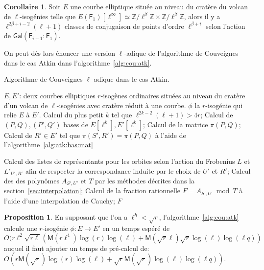 \documentclass[10pt,a4paper]{book}
\theoremstyle{plain}
\theoremstyle{definition}
\theoremstyle{definition}
\newtheorem{cor}[thm]{Corollaire}
\theoremstyle{definition}
\newtheorem{prop}[thm]{Proposition}
\theoremstyle{definition}
\theoremstyle{remark}
\theoremstyle{remark}
\theoremstyle{definition}
\begin{document}
\begin{cor} \label{cor:atk:orb:rep}
Soit $E$ une courbe elliptique située au niveau du cratère du volcan de 
$\ell$-isogénies telle que $E(\mathsf{F}_1)[\ell^{\infty}] \simeq 
\mathbb{Z}/ \ell^{\beta} \mathbb{Z} \times \mathbb{Z}/ \ell^{\beta}\mathbb{Z}$,
alors il y a $\ell^{2\beta + i -2}(\ell+1)$ classes de conjugaison de points 
d'ordre $\ell^{\beta+i}$ selon l'action de $\mathsf{Gal}(
\mathsf{F}_{i+1}:\mathsf{F}_{1})$.
\end{cor}


On peut dès lors énoncer une version $\ell$-adique de l'algorithme de 
Couveignes dans le cas Atkin dans l'algorithme~\ref{alg:cou:atk}.
\begin{algorithm}
\caption{\label{alg:cou:atk} Algorithme de Couveignes $\ell$-adique dans le cas Atkin.}
\begin{algorithmic}[1]
\REQUIRE $E,E'$: deux courbes elliptiques $r$-isogènes ordinaires situées au niveau du cratère d'un volcan de $\ell$-isogénies avec cratère réduit à une courbe.
\ENSURE $\phi$ la $r$-isogénie qui relie $E$ à $E'$.
\STATE Calcul du plus petit $k$ tel que $\ell^{2k-2}(\ell+1)>4r$;
\STATE \label{alg:cou:atk:bas} 
Calcul de $(P,Q),(P',Q')$ bases de $E[\ell^k],E'[\ell^k]$;
\STATE \label{alg:cou:atk:frob:bas} Calcul de la matrice $\pi(P,Q)$;
 \label{alg:cou:atk:parc:poi}
\STATE \label{alg:cou:atk:matc:fro} Calcul de $R' \in E'$ tel que $\pi(S',R')=\pi(P,Q)$ à l'aide de l'algorithme~\ref{alg:atk:bas:mat}
 \label{alg:cou:atk:div:h}

\STATE Calcul des listes de représentants pour les orbites selon l'action du Frobenius $L$ et $L'_{U',R'}$ afin de respecter la correspondance induite par le choix de $U'$ et $R'$; \label{alg:cou:atk:rep}
\STATE \label{alg:cou:atk:int} Calcul des des polynômes $A_{S',U'}$ et $T$ par les méthodes décrites dans la section~\ref{sec:interpolation};
\STATE \label{alg:cou:atk:Cauchy} Calcul de la fraction rationnelle $F=A_{S',U'} \bmod T$ à l'aide d'une interpolation de Cauchy;
 \label{alg:cou:atk:test}
\RETURN $F$
\ENDIF
\ENDFOR
\ENDFOR 
\end{algorithmic}
\end{algorithm}

\begin{prop}
  \label{pro:atk:full-complexity}
  En supposant que l'on a $\ell^h<\sqrt{r}$, 
  l'algorithme~\ref{alg:cou:atk} calcule une $r$-isogénie 
  ${\phi:E \rightarrow E'}$ en un temps espéré de \[
  O(r \ell^2 \sqrt{r \ell}(\mathsf{M}(r\ell^4)\log(r)\log(\ell)+\mathsf{M}(\sqrt{r}\ell)\sqrt{r}\log(\ell)\log(\ell q))\]
auquel il faut ajouter un temps de pré-calcul de:
$O(r \mathsf{M}(\sqrt{r})\log(r)\log(\ell)+ \sqrt{r} \mathsf{M}(\sqrt{r})\log(\ell)\log(\ell q))$.
\end{prop}
\end{document}
